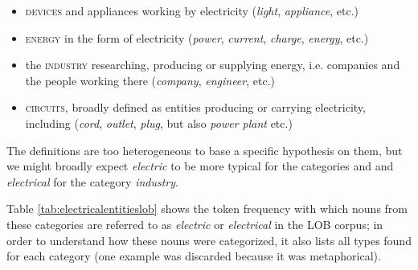 \begin{itemize}

\item \textsc{devices} and appliances working by electricity (\textit{light}, \textit{appliance}, etc.)

\item \textsc{energy} in the form of electricity (\textit{power}, \textit{current}, \textit{charge}, \textit{energy}, etc.)

\item the \textsc{industry} researching, producing or supplying energy, i.e. companies and the people working there (\textit{company}, \textit{engineer}, etc.)

\item \textsc{circuits}, broadly defined as entities producing or carrying electricity, including (\textit{cord}, \textit{outlet}, \textit{plug}, but also \textit{power plant} etc.)

\end{itemize}

The definitions are too heterogeneous to base a specific hypothesis on them, but we might broadly expect \textit{electric} to be more typical for the categories  and  and \textit{electrical} for the category \textit{industry}.

Table \ref{tab:electricalentitieslob} shows the token frequency with which nouns from these categories are referred to as \textit{electric} or \textit{electrical} in the LOB corpus; in order to understand how these nouns were categorized, it also lists all types found for each category (one example was discarded because it was metaphorical).

